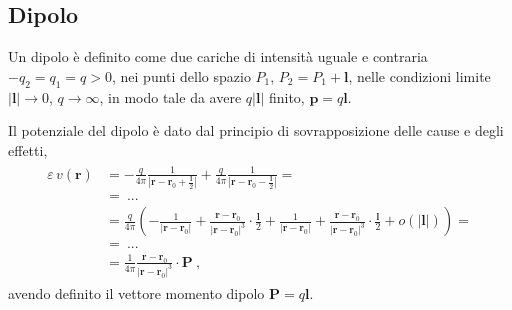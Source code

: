 \documentclass[letterpaper,10pt,english]{jupyterBook}
\begin{document}
\subsection{Dipolo}
\label{\detokenize{ch/numerical-methods:dipolo}}
\sphinxAtStartPar
Un dipolo è definito come due cariche di intensità uguale e contraria \(-q_2 = q_1 = q > 0\), nei punti dello spazio \(P_1\), \(P_2 = P_1 + \mathbf{l}\), nelle condizioni limite \(|\mathbf{l}| \rightarrow 0\), \(q \rightarrow \infty\), in modo tale da avere \(q |\mathbf{l}|\) finito, \(\mathbf{p} = q \mathbf{l}\).

\sphinxAtStartPar
Il potenziale del dipolo è dato dal principio di sovrapposizione delle cause e degli effetti,
\begin{equation*}
\begin{split}\begin{aligned}
  \varepsilon \, v(\mathbf{r})
  & = - \frac{q}{4 \pi }\frac{1}{\left|\mathbf{r} - \mathbf{r}_0 + \frac{\mathbf{l}}{2} \right|} 
      + \frac{q}{4 \pi }\frac{1}{\left|\mathbf{r} - \mathbf{r}_0 - \frac{\mathbf{l}}{2} \right|} = \\
  & = \ ... \\
  & = \frac{q}{4 \pi} \left( 
  - \frac{1}{\left|\mathbf{r} - \mathbf{r}_0 \right|} + \frac{\mathbf{r} - \mathbf{r}_0}{\left|\mathbf{r} - \mathbf{r}_0 \right|^3} \cdot \frac{\mathbf{l}}{2}
  + \frac{1}{\left|\mathbf{r} - \mathbf{r}_0 \right|} + \frac{\mathbf{r} - \mathbf{r}_0}{\left|\mathbf{r} - \mathbf{r}_0 \right|^3} \cdot \frac{\mathbf{l}}{2} + o(|\mathbf{l}|) \right) = \\
  & = \ ... \\
  & = \frac{1}{4 \pi}
 \frac{\mathbf{r} - \mathbf{r}_0}{\left|\mathbf{r} - \mathbf{r}_0 \right|^3} \cdot \mathbf{P} \ ,
\end{aligned}\end{split}
\end{equation*}
\sphinxAtStartPar
avendo definito il vettore momento dipolo \(\mathbf{P} = q \mathbf{l}\).
\end{document}
